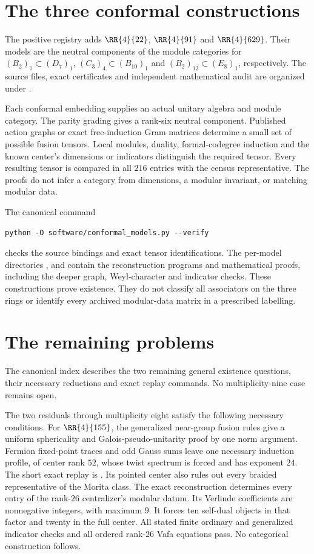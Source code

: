 \documentclass[11pt]{article}
\begin{document}
\section{The three conformal constructions}
The positive registry 
adds $\RR{4}{22}$, $\RR{4}{91}$ and $\RR{4}{629}$.
Their models are the neutral components of the module categories for
$(B_2)_7\subset(D_7)_1$, $(C_3)_4\subset(B_{10})_1$ and
$(B_2)_{12}\subset(E_8)_1$, respectively.
The source files, exact certificates and independent mathematical audit
are organized under .

Each conformal embedding supplies an actual unitary algebra and module
category. The parity grading gives a rank-six neutral component.
Published action graphs or exact free-induction Gram matrices determine
a small set of possible fusion tensors. Local modules, duality,
formal-codegree induction and the known center's dimensions or
indicators distinguish the required tensor. Every resulting tensor is
compared in all $216$ entries with the census representative.
The proofs do not infer a category from dimensions, a modular invariant,
or matching modular data.

The canonical command
\begin{verbatim}
python -O software/conformal_models.py --verify
\end{verbatim}
checks the source bindings and exact tensor identifications. The
per-model directories ,  and
 contain the reconstruction programs and mathematical
proofs, including the deeper graph, Weyl-character and indicator checks.
These constructions prove existence. They do not classify all
associators on the three rings or identify every archived modular-data
matrix in a prescribed labelling.

\section{The remaining problems}
The canonical index  describes the two
remaining general existence questions, their necessary reductions and
exact replay commands. No multiplicity-nine case remains open.

The two residuals through multiplicity eight satisfy the
following necessary conditions. For $\RR{4}{155}$, the generalized near-group fusion rules give a
uniform sphericality and Galois-pseudo-unitarity proof by one norm
argument.
Fermion fixed-point traces and odd Gauss sums leave one necessary
induction profile, of center rank $52$, whose twist spectrum is forced
and has exponent $24$. The short exact replay is
.
Its pointed center also rules out every braided representative of the
Morita class. The exact reconstruction determines every entry of the
rank-$26$ centralizer's modular datum. Its Verlinde coefficients are
nonnegative integers, with maximum $9$. It forces ten self-dual
objects in that factor and twenty in the full center. All stated finite
ordinary and generalized indicator checks and all ordered rank-$26$
Vafa equations pass. No categorical construction follows.
\end{document}
